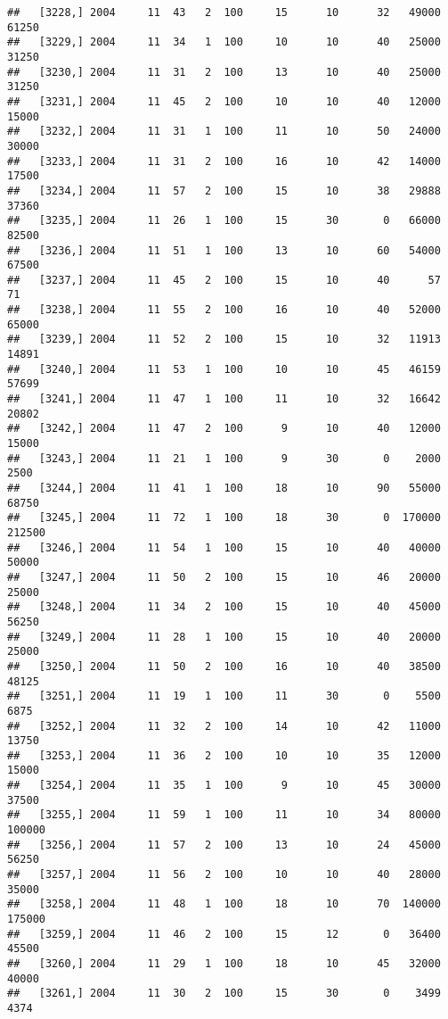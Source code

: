 \documentclass{article}\usepackage[]{graphicx}\usepackage[]{color}
\makeatletter
\newenvironment{kframe}{%
 \def\at@end@of@kframe{}%
 \ifinner\ifhmode%
  \def\at@end@of@kframe{\end{minipage}}%
  \begin{minipage}{\columnwidth}%
 \fi\fi%
 \def\FrameCommand##1{\hskip\@totalleftmargin \hskip-\fboxsep
 \colorbox{shadecolor}{##1}\hskip-\fboxsep
     \hskip-\linewidth \hskip-\@totalleftmargin \hskip\columnwidth}%
 \MakeFramed {\advance\hsize-\width
   \@totalleftmargin\z@ \linewidth\hsize
   \@setminipage}}%
 {\par\unskip\endMakeFramed%
 \at@end@of@kframe}
\newenvironment{knitrout}{}{} %
\makeatother
\begin{document}
\begin{knitrout}
\begin{kframe}
\begin{verbatim}
##   [3228,] 2004     11  43   2  100     15      10      32   49000   61250
##   [3229,] 2004     11  34   1  100     10      10      40   25000   31250
##   [3230,] 2004     11  31   2  100     13      10      40   25000   31250
##   [3231,] 2004     11  45   2  100     10      10      40   12000   15000
##   [3232,] 2004     11  31   1  100     11      10      50   24000   30000
##   [3233,] 2004     11  31   2  100     16      10      42   14000   17500
##   [3234,] 2004     11  57   2  100     15      10      38   29888   37360
##   [3235,] 2004     11  26   1  100     15      30       0   66000   82500
##   [3236,] 2004     11  51   1  100     13      10      60   54000   67500
##   [3237,] 2004     11  45   2  100     15      10      40      57      71
##   [3238,] 2004     11  55   2  100     16      10      40   52000   65000
##   [3239,] 2004     11  52   2  100     15      10      32   11913   14891
##   [3240,] 2004     11  53   1  100     10      10      45   46159   57699
##   [3241,] 2004     11  47   1  100     11      10      32   16642   20802
##   [3242,] 2004     11  47   2  100      9      10      40   12000   15000
##   [3243,] 2004     11  21   1  100      9      30       0    2000    2500
##   [3244,] 2004     11  41   1  100     18      10      90   55000   68750
##   [3245,] 2004     11  72   1  100     18      30       0  170000  212500
##   [3246,] 2004     11  54   1  100     15      10      40   40000   50000
##   [3247,] 2004     11  50   2  100     15      10      46   20000   25000
##   [3248,] 2004     11  34   2  100     15      10      40   45000   56250
##   [3249,] 2004     11  28   1  100     15      10      40   20000   25000
##   [3250,] 2004     11  50   2  100     16      10      40   38500   48125
##   [3251,] 2004     11  19   1  100     11      30       0    5500    6875
##   [3252,] 2004     11  32   2  100     14      10      42   11000   13750
##   [3253,] 2004     11  36   2  100     10      10      35   12000   15000
##   [3254,] 2004     11  35   1  100      9      10      45   30000   37500
##   [3255,] 2004     11  59   1  100     11      10      34   80000  100000
##   [3256,] 2004     11  57   2  100     13      10      24   45000   56250
##   [3257,] 2004     11  56   2  100     10      10      40   28000   35000
##   [3258,] 2004     11  48   1  100     18      10      70  140000  175000
##   [3259,] 2004     11  46   2  100     15      12       0   36400   45500
##   [3260,] 2004     11  29   1  100     18      10      45   32000   40000
##   [3261,] 2004     11  30   2  100     15      30       0    3499    4374

\end{verbatim}
\end{kframe}
\end{knitrout}
\end{document}
